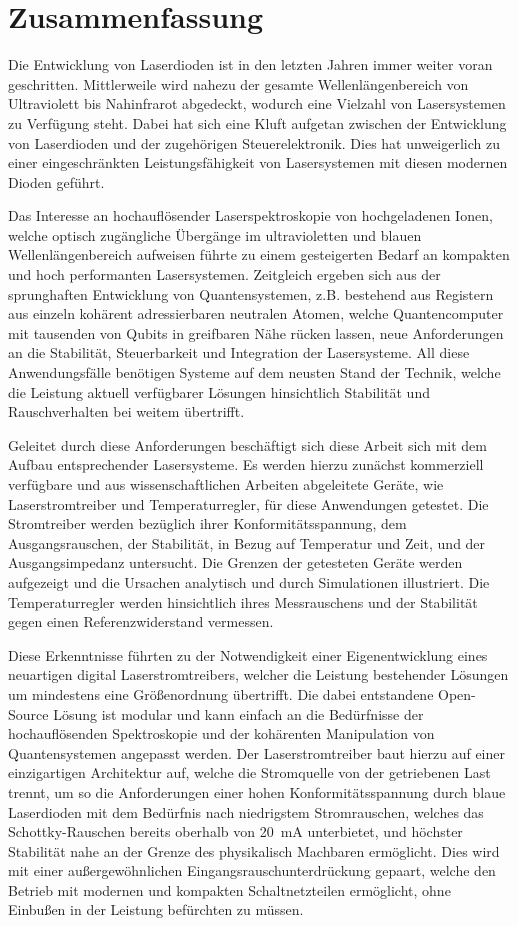 \section*{Zusammenfassung}
Die Entwicklung von Laserdioden ist in den letzten Jahren immer weiter voran geschritten. Mittlerweile wird nahezu der gesamte Wellenlängenbereich von Ultraviolett bis Nahinfrarot abgedeckt, wodurch eine Vielzahl von Lasersystemen zu Verfügung steht. Dabei hat sich eine Kluft aufgetan zwischen der Entwicklung von Laserdioden und der zugehörigen Steuerelektronik. Dies hat unweigerlich zu einer eingeschränkten Leistungsfähigkeit von Lasersystemen mit diesen modernen Dioden geführt.

Das Interesse an hochauflösender Laserspektroskopie von hochgeladenen Ionen, welche optisch zugängliche Übergänge im ultravioletten und blauen Wellenlängenbereich aufweisen führte zu einem gesteigerten Bedarf an kompakten und hoch performanten Lasersystemen. Zeitgleich ergeben sich aus der sprunghaften Entwicklung von Quantensystemen, z.B. bestehend aus Registern aus einzeln kohärent adressierbaren neutralen Atomen, welche Quantencomputer mit tausenden von Qubits in greifbaren Nähe rücken lassen, neue Anforderungen an die Stabilität, Steuerbarkeit und Integration der Lasersysteme. All diese Anwendungsfälle benötigen Systeme auf dem neusten Stand der Technik, welche die Leistung aktuell verfügbarer Lösungen hinsichtlich Stabilität und Rauschverhalten bei weitem übertrifft.

Geleitet durch diese Anforderungen beschäftigt sich diese Arbeit sich mit dem Aufbau entsprechender Lasersysteme. Es werden hierzu zunächst kommerziell verfügbare und aus wissenschaftlichen Arbeiten abgeleitete Geräte, wie Laserstromtreiber und Temperaturregler, für diese Anwendungen getestet. Die Stromtreiber werden bezüglich ihrer Konformitätsspannung, dem Ausgangsrauschen, der Stabilität, in Bezug auf Temperatur und Zeit, und der Ausgangsimpedanz untersucht. Die Grenzen der getesteten Geräte werden aufgezeigt und die Ursachen analytisch und durch Simulationen illustriert. Die Temperaturregler werden hinsichtlich ihres Messrauschens und der Stabilität gegen einen Referenzwiderstand vermessen.

Diese Erkenntnisse führten zu der Notwendigkeit einer Eigenentwicklung eines neuartigen digital Laserstromtreibers, welcher die Leistung bestehender Lösungen um mindestens eine Größenordnung übertrifft. Die dabei entstandene Open-Source Lösung ist modular und kann einfach an die Bedürfnisse der hochauflösenden Spektroskopie und der kohärenten Manipulation von Quantensystemen angepasst werden. Der Laserstromtreiber baut hierzu auf einer einzigartigen Architektur auf, welche die Stromquelle von der getriebenen Last trennt, um so die Anforderungen einer hohen Konformitätsspannung durch blaue Laserdioden mit dem Bedürfnis nach niedrigstem Stromrauschen, welches das Schottky-Rauschen bereits oberhalb von \qty{20}{\mA} unterbietet, und höchster Stabilität nahe an der Grenze des physikalisch Machbaren ermöglicht. Dies wird mit einer außergewöhnlichen Eingangsrauschunterdrückung gepaart, welche den Betrieb mit modernen und kompakten Schaltnetzteilen ermöglicht, ohne Einbußen in der Leistung befürchten zu müssen.

